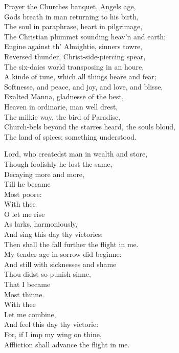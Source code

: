 \documentclass[11pt]{article}
\begin{document}
\begin{poem}
Prayer the Churches banquet, Angels age,\\
Gods breath in man returning to his birth,\\
The soul in paraphrase, heart in pilgrimage,\\
The Christian plummet sounding heav'n and earth;\\

Engine against th' Almightie, sinners towre,\\
Reversed thunder, Christ-side-piercing spear,\\
The six-daies world transposing in an houre,\\
A kinde of tune, which all things heare and fear;\\

Softnesse, and peace, and joy, and love, and blisse,\\
Exalted Manna, gladnesse of the best,\\
Heaven in ordinarie, man well drest,\\
The milkie way, the bird of Paradise,\\

Church-bels beyond the starres heard, the souls bloud,\\
The land of spices; something understood.\\
\end{poem}
\tailpiece

\begin{poem*}
Lord, who createdst man in wealth and store,\\
Though foolishly he lost the same,\\
Decaying more and more,\\
Till he became\\
Most poore:\\
With thee\\
O let me rise\\
As larks, harmoniously,\\
And sing this day thy victories:\\
Then shall the fall further the flight in me.\\

My tender age in sorrow did beginne:\\
And still with sicknesses and shame\\
Thou didst so punish sinne,\\
That I became\\
Most thinne.\\
With thee\\
Let me combine,\\
And feel this day thy victorie:\\
For, if I imp my wing on thine,\\
Affliction shall advance the flight in me.\\
\end{poem*}
\tailpiece
\end{document}

